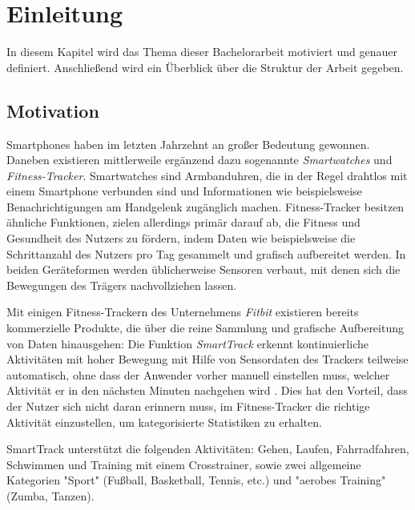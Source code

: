 \chapter{Einleitung}
\label{chap:introduction}

In diesem Kapitel wird das Thema dieser Bachelorarbeit motiviert und genauer definiert. Anschließend wird ein Überblick über die Struktur der Arbeit gegeben. 

\section{Motivation}
Smartphones haben im letzten Jahrzehnt an großer Bedeutung gewonnen. Daneben existieren mittlerweile ergänzend dazu sogenannte \textit{Smartwatches} und \textit{Fitness-Tracker}. Smartwatches sind Armbanduhren, die in der Regel drahtlos mit einem Smartphone verbunden sind und Informationen wie beispielsweise Benachrichtigungen am Handgelenk zugänglich machen. Fitness-Tracker besitzen ähnliche Funktionen, zielen allerdings primär darauf ab, die Fitness und Gesundheit des Nutzers zu fördern, indem Daten wie beispielsweise die Schrittanzahl des Nutzers pro Tag gesammelt und grafisch aufbereitet werden. In beiden Geräteformen werden üblicherweise Sensoren verbaut, mit denen sich die Bewegungen des Trägers nachvollziehen lassen.

Mit einigen Fitness-Trackern des Unternehmens \textit{Fitbit} existieren bereits kommerzielle Produkte, die über die reine Sammlung und grafische Aufbereitung von Daten hinausgehen: Die Funktion \textit{SmartTrack} erkennt kontinuierliche Aktivitäten mit hoher Bewegung mit Hilfe von Sensordaten des Trackers teilweise automatisch, ohne dass der Anwender vorher manuell einstellen muss, welcher Aktivität er in den nächsten Minuten nachgehen wird \cite{FitbitSmartTrack}. Dies hat den Vorteil, dass der Nutzer sich nicht daran erinnern muss, im Fitness-Tracker die richtige Aktivität einzustellen, um kategorisierte Statistiken zu erhalten.

SmartTrack unterstützt die folgenden Aktivitäten: Gehen, Laufen, Fahrradfahren, Schwimmen und Training mit einem Crosstrainer, sowie zwei allgemeine Kategorien "Sport" (Fußball, Basketball, Tennis, etc.) und "aerobes Training" (Zumba, Tanzen).

